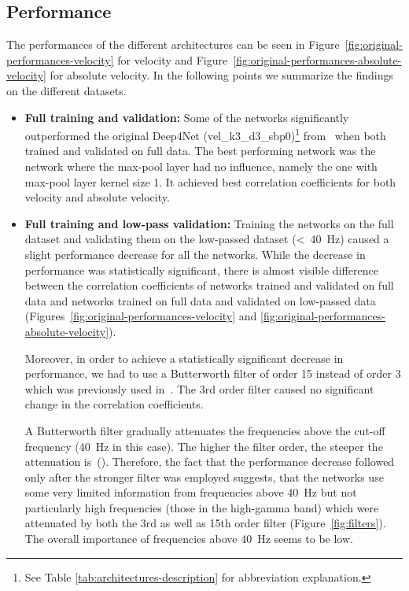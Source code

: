 \subsection{Performance}\label{subsec:performance}
The performances of the different architectures can be seen in Figure~\ref{fig:original-performances-velocity} for velocity and Figure~\ref{fig:original-performances-absolute-velocity} for absolute velocity.
In the following points we summarize the findings on the different datasets.

\begin{itemize}
    \item \textbf{Full training and validation:} Some of the networks significantly outperformed the original Deep4Net (vel\_k3\_d3\_sbp0)\footnote{See Table \ref{tab:architectures-description} for abbreviation explanation.} from~\cite{Hammer-2021} when both trained and validated on full data.
    The best performing network was the network where the max-pool layer had no influence, namely the one with max-pool layer kernel size 1. It achieved best correlation coefficients for both velocity and absolute velocity.
    
    \item \textbf{Full training and low-pass validation:} Training the networks on the full dataset and validating them on the low-passed dataset (<~40~Hz) caused a slight performance decrease for all the networks. While the decrease in performance was statistically significant, there is almost visible difference between the correlation coefficients of networks trained and validated on full data and networks trained on full data and validated on low-passed data (Figures~\ref{fig:original-performances-velocity} and \ref{fig:original-performances-absolute-velocity}).
    
    Moreover, in order to achieve a statistically significant decrease in performance, we had to use a Butterworth filter of order 15 instead of order 3 which was previously used in~\cite{Hammer-2021}. The 3rd order filter caused no significant change in the correlation coefficients. 
    
    A Butterworth filter gradually attenuates the frequencies above the cut-off frequency (40~Hz in this case).
    The higher the filter order, the steeper the attenuation is~(\cite{butterworth1930theory}).
    Therefore, the fact that the performance decrease followed only after the stronger filter was employed suggests, that the networks use some very limited information from frequencies above 40~Hz but not particularly high frequencies (those in the high-gamma band) which were attenuated by both the 3rd as well as 15th order filter (Figure~\ref{fig:filters}).
    The overall importance of frequencies above 40~Hz seems to be low. 
    

\end{itemize}
